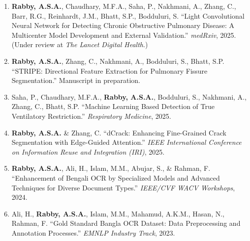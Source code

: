 \documentclass[11pt]{article}
\begin{document}
\begin{enumerate}
  \item \textbf{Rabby, A.S.A.}, Chaudhary, M.F.A., Saha, P., Nakhmani, A., Zhang, C., Barr, R.G., Reinhardt, J.M., Bhatt, S.P., Bodduluri, S. ``Light Convolutional Neural Network for Detecting Chronic Obstructive Pulmonary Disease: A Multicenter Model Development and External Validation.'' \textit{medRxiv}, 2025. (Under review at \textit{The Lancet Digital Health}.)

  \item \textbf{Rabby, A.S.A.}, Zhang, C., Nakhmani, A., Bodduluri, S., Bhatt, S.P. ``STRIPE: Directional Feature Extraction for Pulmonary Fissure Segmentation.'' Manuscript in preparation.

  \item Saha, P., Chaudhary, M.F.A., \textbf{Rabby, A.S.A.}, Bodduluri, S., Nakhmani, A., Zhang, C., Bhatt, S.P. ``Machine Learning Based Detection of True Ventilatory Restriction.'' \textit{Respiratory Medicine}, 2025.

  \item \textbf{Rabby, A.S.A.} \& Zhang, C. ``dCrack: Enhancing Fine-Grained Crack Segmentation with Edge-Guided Attention.'' \textit{IEEE International Conference on Information Reuse and Integration (IRI)}, 2025.

  \item \textbf{Rabby, A.S.A.}, Ali, H., Islam, M.M., Abujar, S., \& Rahman, F. ``Enhancement of Bengali OCR by Specialized Models and Advanced Techniques for Diverse Document Types.'' \textit{IEEE/CVF WACV Workshops}, 2024.

  \item Ali, H., \textbf{Rabby, A.S.A.}, Islam, M.M., Mahamud, A.K.M., Hasan, N., Rahman, F. ``Gold Standard Bangla OCR Dataset: Data Preprocessing and Annotation Processes.'' \textit{EMNLP Industry Track}, 2023.
\end{enumerate}

\end{document}
